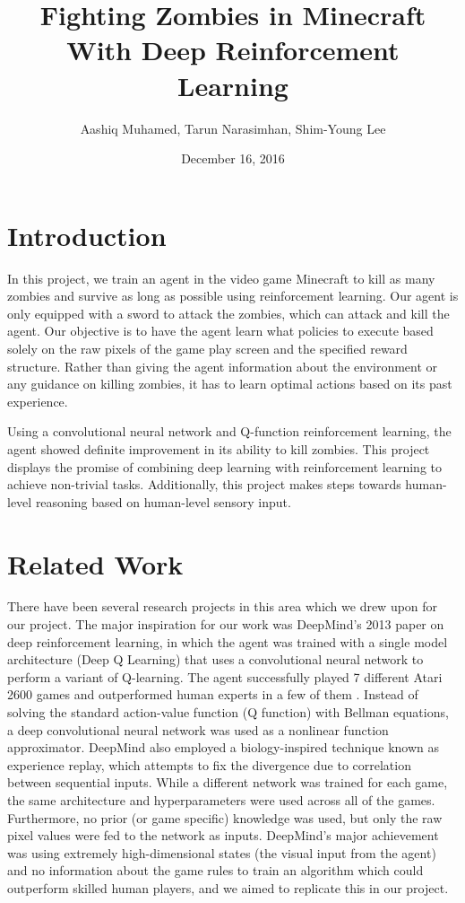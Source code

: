 \documentclass{article}
\title{Fighting Zombies in Minecraft With Deep Reinforcement Learning}
\author{Aashiq Muhamed, Tarun Narasimhan, Shim-Young Lee}
\date{December 16, 2016}
\begin{document}
\maketitle

\begin{multicols}{2}

\section{Introduction}

In this project, we train an agent in the video game Minecraft to kill as many zombies and survive as long as possible using reinforcement learning. Our agent is only equipped with a sword to attack the zombies, which can attack and kill the agent. Our objective is to have the agent learn what policies to execute based solely on the raw pixels of the game play screen and the specified reward structure. Rather than giving the agent information about the environment or any guidance on killing zombies, it has to learn optimal actions based on its past experience.

Using a convolutional neural network and Q-function reinforcement learning, the agent showed definite improvement in its ability to kill zombies. This project displays the promise of combining deep learning with reinforcement learning to achieve non-trivial tasks.
Additionally, this project makes steps towards human-level reasoning based on human-level sensory input.




\section{Related Work}

There have been several research projects in this area which we drew upon for our project.
The major inspiration for our work was DeepMind's 2013 paper on deep reinforcement learning, in which the agent was trained with a single model architecture (Deep Q Learning) that uses a convolutional neural network to perform a variant of Q-learning. The agent successfully played 7 different Atari 2600 games and outperformed human experts in a few of them \cite{deepMind}.
Instead of solving the standard action-value function (Q function) with Bellman equations, a deep convolutional neural network was used as a nonlinear function approximator. DeepMind also employed a biology-inspired technique known as experience replay, which attempts to fix the divergence due to correlation between sequential inputs.
While a different network was trained for each game, the same architecture and hyperparameters were used across all of the games.
Furthermore, no prior (or game specific) knowledge was used, but only the raw pixel values were fed to the network as inputs.
DeepMind's major achievement was using extremely high-dimensional states (the visual input from the agent) and no information about the game rules to train an algorithm which could outperform skilled human players, and we aimed to replicate this in our project.


\end{multicols}
\end{document}

